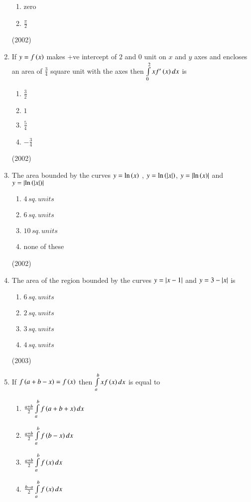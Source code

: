 \documentclass[journal,12pt,twocolumn]{IEEEtran}
\theoremstyle{remark}
\begin{document}
\begin{enumerate}
\begin{enumerate}
					\item zero
					\item $\frac{\pi}{2}$
			\end{enumerate}
			\hfill (2002)
	\item
		If $y=f\left(x\right)$ makes +ve intercept of $2$ and $0$ unit on $x$ and $y$ axes and encloses an area of $\frac{3}{4}$ square unit with the axes then $\int \limits_0^2 x f^{\prime}\left(x\right)dx$ is
			\begin{enumerate}
				\itemsep0.3em
				\item $\frac{3}{2}$
				\item $1$
				\item $\frac{5}{4}$
				\item $-\frac{3}{4}$
			\end{enumerate}
			\hfill (2002)
	\item
		The area bounded by the curves $y= \ln \left(x\right)$ , $y= \ln \left(\left\vert x\right\vert\right)$, $y=\left\vert\ln\left(x\right)\right\vert$ and $y=\left\vert\ln \left(\left\vert x\right\vert\right)\right\vert$
			\begin{enumerate}
					\item $4 \, sq. \, units$
					\item $6 \, sq. \, units$
					\item $10 \, sq. \, units$
					\item none of these
			\end{enumerate}
			\hfill(2002)
	\item
		The area of the region bounded by the curves $y= \left\vert x-1\right\vert$ and $y=3-\left\vert x\right\vert$ is
			\begin {enumerate}
				\item $6 \, sq. \, units$
				\item $2 \, sq. \, units$
				\item $3 \, sq. \, units$
				\item $4 \, sq. \, units$
			\end {enumerate}
			\hfill (2003)
	\item
		If $f\left(a+b-x\right)=f\left(x\right)$ then $\int \limits_a^b xf\left(x\right)dx$ is equal to
			\begin {enumerate}
				\itemsep0.3em
				\item $\frac{a+b}{2} \int \limits_a^b f\left(a+b+x\right)dx$
				\item $\frac{a+b}{2} \int \limits_a^b f\left(b-x\right)dx$
				\item $\frac{a+b}{2} \int \limits_a^b f\left(x\right)dx$
				\item $\frac{b-a}{2} \int \limits_a^b f\left(x\right)dx$
			\end {enumerate}

\end{enumerate}
\end{document}
